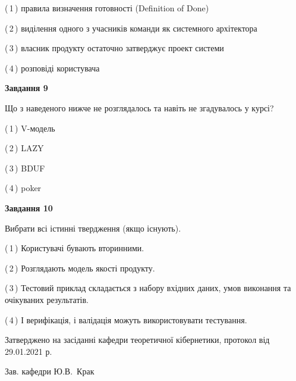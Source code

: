 \documentclass[10pt, ukrainian]{article}
\begin{document}
{\begin {large}
(\,1\,) правила визначення готовності (Definition of Done) %



(\,2\,) виділення одного з учасників команди як системного архітектора%



(\,3\,) власник продукту остаточно затверджує проект системи%



(\,4\,) розповіді користувача%


{\begin {center}\textbf{Завдання 9}\end {center}}\par
Що з наведеного нижче не розглядалось та навіть не згадувалось у курсі?\par
\vspace{2mm}



(\,1\,) V-модель%



(\,2\,) LAZY%



(\,3\,) BDUF%



(\,4\,) poker%


{\begin {center}\textbf{Завдання 10}\end {center}}\par
Вибрати всі істинні твердження (якщо існують).\par
\vspace{2mm}



(\,1\,) Користувачі бувають вторинними.%



(\,2\,) Розглядають модель якості продукту.%



(\,3\,) Тестовий приклад складається з набору вхідних даних, умов виконання та очікуваних результатів.%



(\,4\,) І верифікація, і валідація можуть використовувати тестування.%



\end {large}}
{\vspace{5mm}\smallskip \begin {small} Затверджено на засіданні кафедри теоретичної кібернетики, протокол  від   29.01.2021 р.\par\smallskip\smallskip
{\parbox {6.5 cm}{Зав. кафедри \dotfill Ю.В.~Крак}} \end{small}}
\newpage
\end{document}
